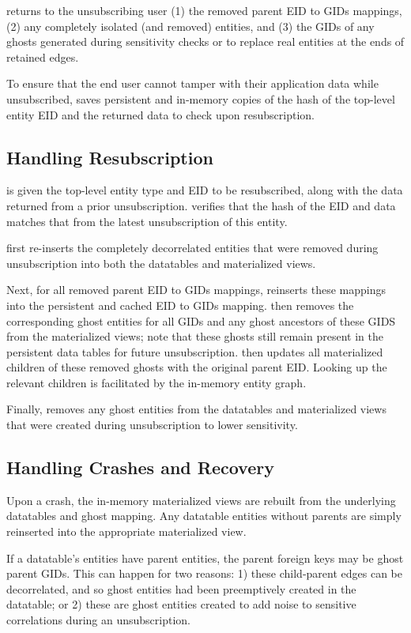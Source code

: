 \name returns to the unsubscribing user (1) the removed parent EID to GIDs mappings, (2) any
completely isolated (and removed) entities,
and (3) the GIDs of any ghosts generated during sensitivity checks or to replace real
entities at the ends of retained edges.

To ensure that the end user cannot tamper with their application data while unsubscribed, \name saves
persistent and in-memory copies of the hash of the top-level entity EID and the returned data to
check upon resubscription.

\subsection{Handling Resubscription}
\name is given the top-level entity type and EID to be resubscribed, along with the data returned
from a prior unsubscription.
\name verifies that the hash of the EID and data matches that from the latest unsubscription of
this entity.

\name first re-inserts the completely decorrelated entities that were removed during unsubscription
into both the datatables and materialized views. 

Next, for all removed parent EID to GIDs mappings, \name reinserts these mappings into the
persistent and cached EID to GIDs mapping.
\name then removes the corresponding ghost entities for all GIDs and any ghost ancestors of these
GIDS from the materialized views; note that these ghosts still remain present in the
persistent data tables for future unsubscription.
\name then updates all materialized children of these removed ghosts with the original parent EID. Looking up the relevant
children is facilitated by the in-memory entity graph. 

Finally, \name removes any
ghost entities from the datatables and materialized views that were created during unsubscription to
lower sensitivity.

\subsection{Handling Crashes and Recovery}
Upon a crash, the in-memory materialized views are rebuilt from the underlying datatables and ghost
mapping. Any datatable entities without parents are simply reinserted into the appropriate
materialized view. 

If a datatable's entities have parent entities, the parent foreign keys may be ghost parent GIDs. 
This can happen for two reasons: 1) these child-parent edges can be decorrelated, and so ghost
entities had been preemptively created in the datatable; or 2) these are ghost entities created to
add noise to sensitive correlations during an unsubscription. 

